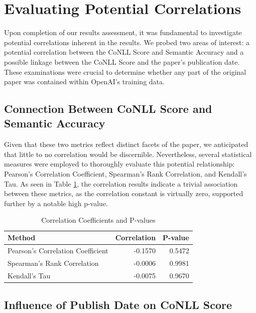 \section{Evaluating Potential Correlations}

Upon completion of our results assessment, it was fundamental to investigate potential correlations inherent in the results. We probed two areas of interest: a potential correlation between the CoNLL Score and Semantic Accuracy and a possible linkage between the CoNLL Score and the paper's publication date. These examinations were crucial to determine whether any part of the original paper was contained within OpenAI's training data.


\subsection{Connection Between CoNLL Score and Semantic Accuracy}

Given that these two metrics reflect distinct facets of the paper, we anticipated that little to no correlation would be discernible. Nevertheless, several statistical measures were employed to thoroughly evaluate this potential relationship: Pearson's Correlation Coefficient, Spearman's Rank Correlation, and Kendall's Tau. As seen in Table \ref{tab:spearman}, the correlation results indicate a trivial association between these metrics, as the correlation constant is virtually zero, supported further by a notable high p-value.

\begin{table}[htpb]
    \centering
    \caption{Correlation Coefficients and P-values}\label{tab:spearman}
        \begin{tabular}{lrr}
        \hline
        Method & Correlation & P-value \\
        \hline
        Pearson's Correlation Coefficient & -0.1570 & 0.5472 \\
        Spearman's Rank Correlation & -0.0006 & 0.9981 \\
        Kendall's Tau & -0.0075 & 0.9670 \\
        \hline
    \end{tabular}
\end{table}

\subsection{Influence of Publish Date on CoNLL Score}

